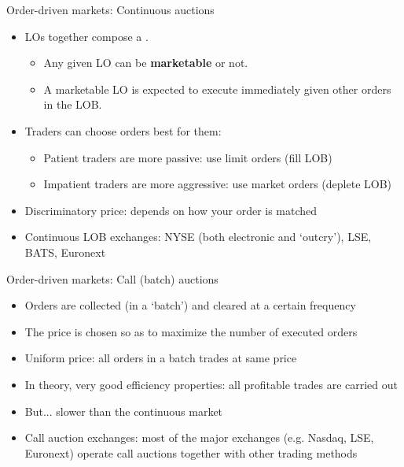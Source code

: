 \documentclass[english,10pt
,aspectratio=169
]{beamer}
\begin{document}
\begin{frame}{Order-driven markets: Continuous auctions}
\begin{itemize}
	\item LOs together compose a .
	\begin{itemize}
		\item Any given LO can be \textbf{marketable} or not.
		\item A marketable LO is expected to execute immediately given other orders in the LOB.
	\end{itemize}
	\item Traders can choose orders best for them:
	\begin{itemize}
		\item Patient traders are more passive: use limit orders (fill LOB)
		\item Impatient traders are more aggressive: use market orders (deplete LOB)
	\end{itemize}
	\item \alert{Discriminatory price}: depends on how your order is matched
	\item Continuous LOB exchanges: NYSE (both electronic and `outcry'), LSE, BATS, Euronext
\end{itemize}
\end{frame}


\begin{frame}{Order-driven markets: Call (batch) auctions}
\begin{itemize}
	\item Orders are collected (in a `batch') and cleared at a certain frequency
	\item The price is chosen so as to maximize the number of executed orders
	\item \alert{Uniform price}: all orders in a batch trades at same price
	\item In theory,  very good efficiency properties: all profitable trades are carried out
	\item But... slower than the continuous market
	\item Call auction exchanges: most of the major exchanges (e.g. Nasdaq, LSE, Euronext) operate call auctions together with other trading methods
\end{itemize}
\end{frame}
\end{document}
